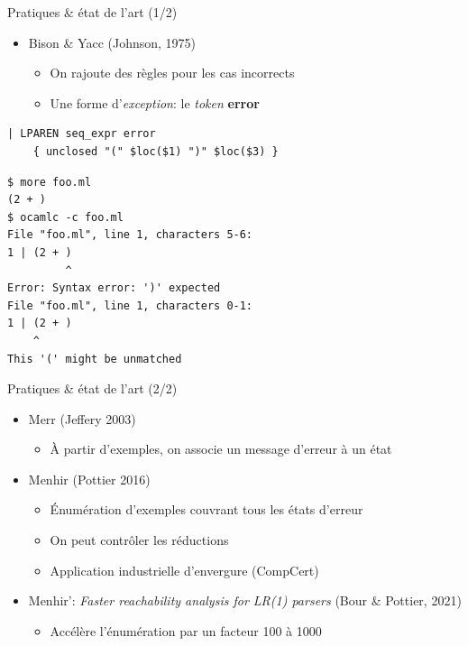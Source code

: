\documentclass{beamer}          %
\begin{document}
\begin{frame}[fragile]{Pratiques \& état de l'art (1/2)}
  \begin{itemize}
    \item Bison \& Yacc (Johnson, 1975)
      \begin{itemize}
      \item On rajoute des règles pour les cas incorrects
      \item Une forme d'{\em exception}: le {\em token} \textbf{error}
      \end{itemize}
  \end{itemize}
\pause
\small
\begin{verbatim}
| LPAREN seq_expr error
    { unclosed "(" $loc($1) ")" $loc($3) }
\end{verbatim}
\pause
\begin{verbatim}
$ more foo.ml
(2 + )
$ ocamlc -c foo.ml
File "foo.ml", line 1, characters 5-6:
1 | (2 + )
         ^
Error: Syntax error: ')' expected
File "foo.ml", line 1, characters 0-1:
1 | (2 + )
    ^
This '(' might be unmatched
\end{verbatim}
\end{frame}

\begin{frame}{Pratiques \& état de l'art (2/2)}
  \begin{itemize}
    \item Merr (Jeffery 2003)
      \begin{itemize}
        \item À partir d'exemples, on associe un message d'erreur à un état
      \end{itemize}
    \pause
    \item Menhir (Pottier 2016)
      \begin{itemize}
        \item Énumération d'exemples couvrant tous les états d'erreur
        \item On peut contrôler les réductions 
        \item Application industrielle d'envergure (CompCert)
      \end{itemize}
    \pause
    \pause
    \item Menhir': {\em Faster reachability analysis for LR(1) parsers} (Bour \& Pottier, 2021)
      \begin{itemize}
        \item Accélère l'énumération par un facteur 100 à 1000
      \end{itemize}
  \end{itemize}
\end{frame}
\end{document}
